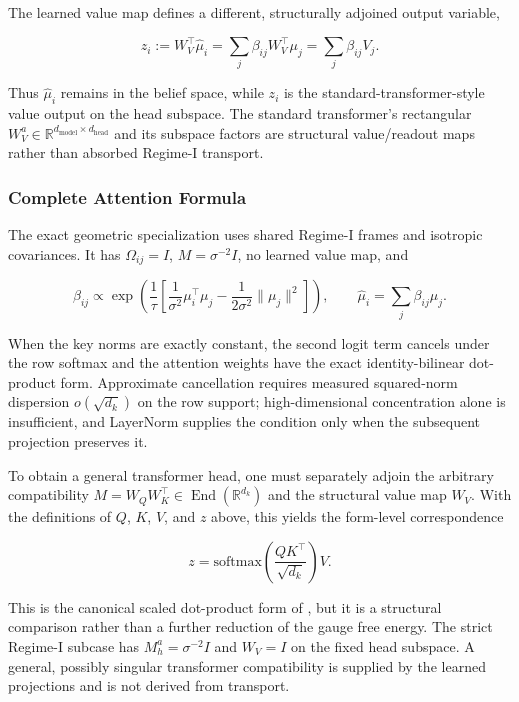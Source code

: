 \documentclass[twoside,11pt]{article}
\begin{document}
The learned value map defines a different, structurally adjoined output variable,

\begin{equation}
\boxed{z_i := W_V^\top\hat\mu_i = \sum_j\beta_{ij}W_V^\top\mu_j = \sum_j\beta_{ij}V_j}.
\end{equation}

Thus $\hat\mu_i$ remains in the belief space, while $z_i$ is the standard-transformer-style value output on the head subspace. The standard transformer's rectangular $W_V^a \in \mathbb{R}^{d_{\text{model}} \times d_{\text{head}}}$ and its subspace factors are structural value/readout maps rather than absorbed Regime-I transport.

\subsubsection{Complete Attention Formula}

The exact geometric specialization uses shared Regime-I frames and isotropic covariances. It has $\Omega_{ij}=I$, $M=\sigma^{-2}I$, no learned value map, and

\begin{equation}
\beta_{ij} \propto \exp\left(\frac{1}{\tau}\left[\frac{1}{\sigma^2}\mu_i^\top\mu_j - \frac{1}{2\sigma^2}\|\mu_j\|^2\right]\right),
\qquad
\hat\mu_i = \sum_j\beta_{ij}\mu_j.
\end{equation}

When the key norms are exactly constant, the second logit term cancels under the row softmax and the attention weights have the exact identity-bilinear dot-product form. Approximate cancellation requires measured squared-norm dispersion $o(\sqrt{d_k})$ on the row support; high-dimensional concentration alone is insufficient, and LayerNorm supplies the condition only when the subsequent projection preserves it.

To obtain a general transformer head, one must separately adjoin the arbitrary compatibility $M=W_QW_K^\top \in \operatorname{End}(\mathbb{R}^{d_k})$ and the structural value map $W_V$. With the definitions of $Q$, $K$, $V$, and $z$ above, this yields the form-level correspondence

\begin{equation}
\boxed{z = \mathrm{softmax}\left(\frac{QK^\top}{\sqrt{d_k}}\right)V}.
\end{equation}

This is the canonical scaled dot-product form of \citet{vaswani2017attention}, but it is a structural comparison rather than a further reduction of the gauge free energy. The strict Regime-I subcase has $M_h^a = \sigma^{-2}I$ and $W_V=I$ on the fixed head subspace. A general, possibly singular transformer compatibility is supplied by the learned projections and is not derived from transport.
\end{document}
